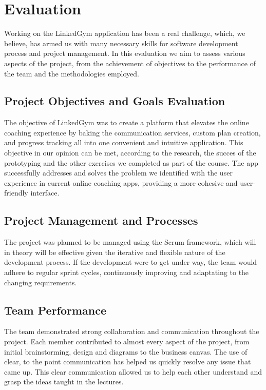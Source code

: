 

\section{Evaluation}

Working on the LinkedGym application has been a real challenge, which, we believe, has armed us with many necessary skills for software development process and project management. In this evaluation we aim to assess various aspects of the project, from the achievement of objectives to the performance of the team and the methodologies employed.

\subsection{Project Objectives and Goals Evaluation}
The objective of LinkedGym was to create a platform that elevates the online coaching experience by baking the communication services, custom plan creation, and progress tracking all into one convenient and intuitive application. This objective in our opinion can be met, according to the research, the succes of the prototyping and the other exercises we completed as part of the course. The app successfully addresses and solves the problem we identified with the user experience in current online coaching apps, providing a more cohesive and user-friendly interface.

\subsection{Project Management and Processes}
The project was planned to be managed using the Scrum framework, which will in theory will be effective given the iterative and flexible nature of the development process. If the development were to get under way, the team would adhere to regular sprint cycles, continuously improving and adaptating to the changing requirements.

\subsection{Team Performance}
The team demonstrated strong collaboration and communication throughout the project. Each member contributed to almost every aspect of the project, from initial brainstorming, design and diagrams to the business canvas. The use of clear, to the point communication has helped us quickly resolve any issue that came up. This clear communication allowed us to help each other understand and grasp the ideas taught in the lectures.

